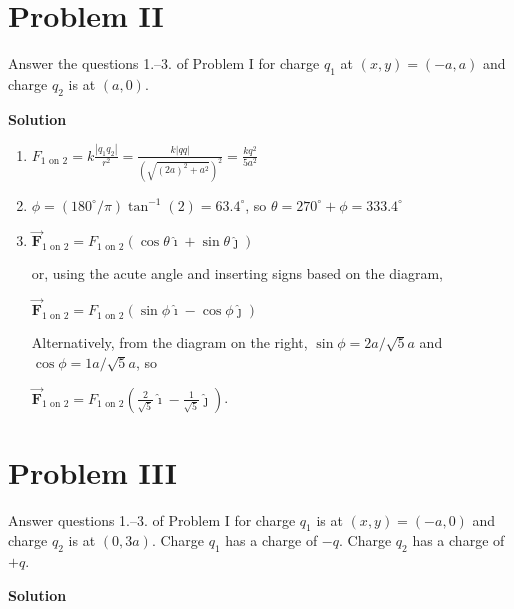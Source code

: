 \documentclass{article}
\renewcommand{\mbox}{\text}
\newcommand{\ds}[0]{\displaystyle}
\newcommand{\ihat}[0]{\hat{\boldsymbol{\imath}}}
\newcommand{\jhat}[0]{\hat{\boldsymbol{\jmath}}}
\newcommand{\bfvec}[1]{\vec{\mathbf{#1}}}
\begin{document}

\fi

\newpage

\section{Problem II}

Answer the questions 1.--3. of Problem I for charge $q_1$ at $(x,y)=(-a,a)$ and charge $q_2$ is at $(a, 0)$.

\ifsolutions
{\bf Solution}



    \begin{enumerate}

      \item $\ds F_{1\mbox{ on } 2}=k\frac{|q_1q_2|}{r^2}=\frac{k|qq|}{(\sqrt{(2a)^2+a^2})^2}=\frac{kq^2}{5a^2}$

      \item $\phi=(180^\circ/\pi)\tan^{-1}(2) = 63.4^\circ$, so $\theta = 270^\circ + \phi = 333.4^\circ$

      \item $\bfvec{F}_{1\mbox{ on } 2} = F_{1\mbox{ on } 2}(\cos \theta \ihat + \sin \theta\jhat)$

            or, using the acute angle and inserting signs based on the diagram,

            $\bfvec{F}_{1\mbox{ on } 2} = F_{1\mbox{ on } 2}(\sin \phi \ihat - \cos \phi\jhat)$

            Alternatively, from the diagram on the right, $\sin\phi = 2a/\sqrt{5}a$ and $\cos\phi = 1a/\sqrt{5}a$, so

            $\ds\bfvec{F}_{1\mbox{ on } 2} = F_{1\mbox{ on } 2}\left(\frac{2}{\sqrt{5}}\ihat - \frac{1}{\sqrt{5}}\jhat\right)$.

    \end{enumerate}
\else


\fi

\newpage

\section{Problem III}

Answer questions 1.--3. of Problem I for charge $q_1$ is at $(x,y)=(-a,0)$ and charge $q_2$ is at $(0, 3a)$. Charge $q_1$ has a charge of $-q$. Charge $q_2$ has a charge of $+q$.

\ifsolutions
{\bf Solution}

\end{document}
